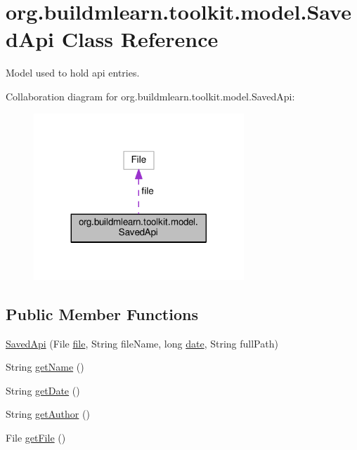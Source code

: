 \hypertarget{classorg_1_1buildmlearn_1_1toolkit_1_1model_1_1SavedApi}{}\section{org.\+buildmlearn.\+toolkit.\+model.\+Saved\+Api Class Reference}
\label{classorg_1_1buildmlearn_1_1toolkit_1_1model_1_1SavedApi}


Model used to hold api entries.  




Collaboration diagram for org.\+buildmlearn.\+toolkit.\+model.\+Saved\+Api\+:
\nopagebreak
\begin{figure}[H]
\begin{center}
\leavevmode
\includegraphics[width=224pt]{classorg_1_1buildmlearn_1_1toolkit_1_1model_1_1SavedApi__coll__graph}
\end{center}
\end{figure}
\subsection*{Public Member Functions}
\begin{DoxyCompactItemize}
\item 
\hyperlink{classorg_1_1buildmlearn_1_1toolkit_1_1model_1_1SavedApi_ac302531a877b09309ac9fe26b1f1f17c}{Saved\+Api} (File \hyperlink{classorg_1_1buildmlearn_1_1toolkit_1_1model_1_1SavedApi_a4d6618eb1dbe1911ae4cfd5f29809f51}{file}, String file\+Name, long \hyperlink{classorg_1_1buildmlearn_1_1toolkit_1_1model_1_1SavedApi_a2dfeb57d1a979b07d00e9c8a3578b5b0}{date}, String full\+Path)
\item 
String \hyperlink{classorg_1_1buildmlearn_1_1toolkit_1_1model_1_1SavedApi_a11c9d3c5bec921cd119b28b6ca64ed65}{get\+Name} ()
\item 
String \hyperlink{classorg_1_1buildmlearn_1_1toolkit_1_1model_1_1SavedApi_a4a55831dd42db4ccb3854fa575e6ec5b}{get\+Date} ()
\item 
String \hyperlink{classorg_1_1buildmlearn_1_1toolkit_1_1model_1_1SavedApi_af90866b995e4374f0af4618d78f56cf4}{get\+Author} ()
\item 
File \hyperlink{classorg_1_1buildmlearn_1_1toolkit_1_1model_1_1SavedApi_a7e46f46c8ddac95dec21c0d06cfcc16e}{get\+File} ()
\end{DoxyCompactItemize}
